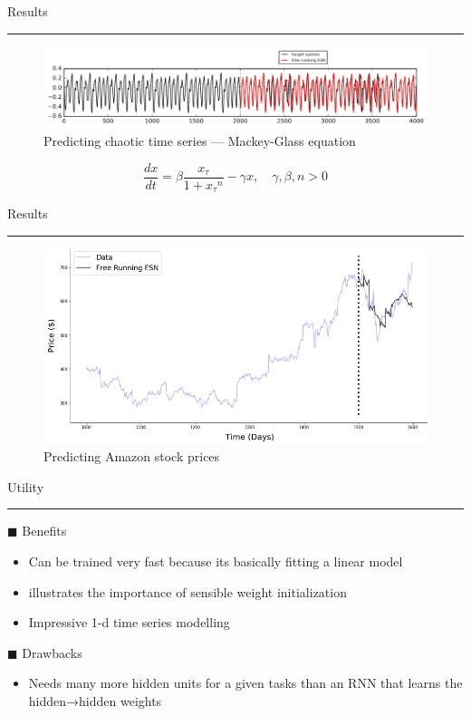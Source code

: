 \documentclass[c,compress]{beamer}
\def\bsq{\color{blue(pigment)} $\blacksquare$ \color{black}}
\begin{document}
\begin{frame}{Results\\\rule{10.5cm}{0.5pt}} \label{slide6}
\begin{figure}
    \centering
    \includegraphics[width=0.85\linewidth]{ESN_mackey_glass.png}
    \\Predicting chaotic time series --- Mackey-Glass equation
    \label{fig:mackey}
\end{figure}
\[
\frac{dx}{dt} = \beta \frac{ x_{\tau} }{1+{x_{\tau}}^n}-\gamma x, \quad \gamma,\beta,n > 0
\]
\end{frame}

\begin{frame}{Results\\\rule{10.5cm}{0.5pt}} \label{slide7}
\begin{figure}
    \centering
    \includegraphics[width=0.80\linewidth]{amazon_predict_esn.png}
    \\ Predicting Amazon stock prices 
    \label{fig:amazon}
\end{figure}

\end{frame}

\begin{frame}{Utility\\\rule{10.5cm}{0.5pt}} \label{slide7}
\bsq Benefits 
\begin{itemize}
    \item Can be trained very fast because its basically fitting a linear model
    \item illustrates the importance of sensible weight initialization
    \item Impressive 1-d time series modelling
\end{itemize}
\bsq Drawbacks 
\begin{itemize}
    \item Needs many more hidden units for a given tasks than an RNN that learns the hidden→hidden weights
\end{itemize}
\end{frame}
\end{document}
